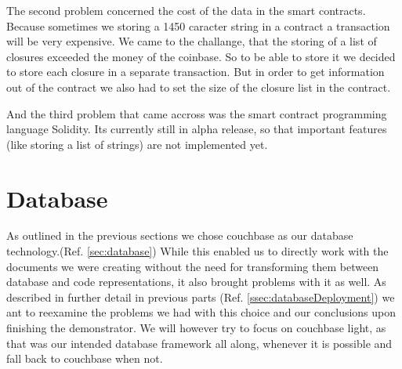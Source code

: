 The second problem concerned the cost of the data in the smart contracts. Because sometimes we storing a 1450 caracter string in a contract a transaction will be very expensive.
We came to the challange, that the storing of a list of closures exceeded the money of the coinbase. So to be able to store it we decided to store each closure in a separate transaction. But in order to get information out of the contract we also had to set the size of the closure list in the contract.

And the third problem that came accross was the smart contract programming language Solidity. Its currently still in alpha release, so that important features (like storing a list of strings) are not implemented yet.

\section{Database}
\label{sec:databaseEval}
As outlined in the previous sections we chose couchbase as our database technology.(Ref. \ref{sec:database})
While this enabled us to directly work with the documents we were creating without the need for transforming them between
database and code representations, it also brought problems with it as well.
As described in further detail in previous parts (Ref. \ref{ssec:databaseDeployment}) we ant to reexamine the problems
we had with this choice and our conclusions upon finishing the demonstrator.
We will however try to focus on couchbase light, as that was our intended database framework all along, whenever it is
possible and fall back to couchbase when not.

